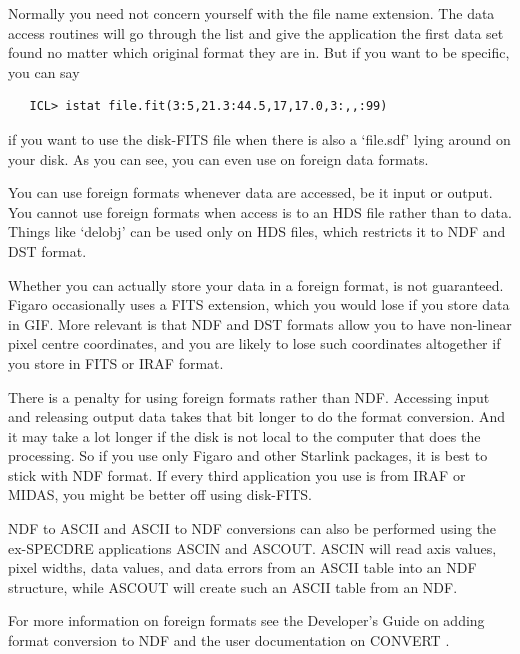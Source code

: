    Normally you need not concern yourself with the file name
   extension. The data access routines will go through the list and
   give the application the first data set found no matter which
   original format they are in. But if you want to be specific, you
   can say

\begin{verbatim}
   ICL> istat file.fit(3:5,21.3:44.5,17,17.0,3:,,:99)
\end{verbatim}

   if you want to use the disk-FITS file when there is also a
   `file.sdf' lying around on your disk. As you can see, you can even
   use  on foreign data formats.

   You can use foreign formats whenever data are accessed, be it input
   or output. You cannot use foreign formats when access is to an HDS
   file rather than to data. Things like `delobj' can be used only on
   HDS files, which restricts it to NDF and DST format.

   Whether you can actually store your data in a foreign format, is
   not guaranteed. Figaro occasionally uses a FITS extension, which you
   would lose if you store data in GIF. More relevant is that NDF and
   DST formats allow you to have non-linear pixel centre coordinates,
   and you are likely to lose such coordinates altogether if you store
   in FITS or IRAF format.

   There is a penalty for using foreign formats rather than NDF.
   Accessing input and releasing output data takes that bit longer to
   do the format conversion. And it may take a lot longer if the disk
   is not local to the computer that does the processing. So if you
   use only Figaro and other Starlink packages, it is best to stick
   with NDF format. If every third application you use is from IRAF
   or MIDAS, you might be better off using disk-FITS.

   NDF to ASCII and ASCII to NDF conversions can also be performed
   using the ex-SPECDRE applications ASCIN and ASCOUT. ASCIN will
   read axis values, pixel widths, data values, and data errors from
   an ASCII table into an NDF structure, while ASCOUT will create
   such an ASCII table from an NDF.

   For more information on foreign formats see the Developer's Guide
   on adding format conversion to NDF 
   and the user documentation on CONVERT .


